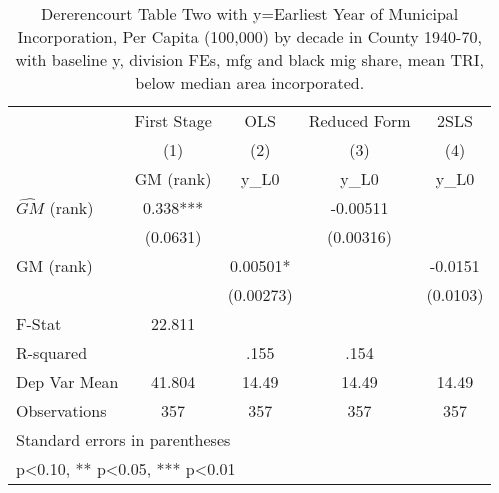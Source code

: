 \begin{table}[htbp]\centering
\def\sym#1{\ifmmode^{#1}\else\(^{#1}\)\fi}
\caption{Dererencourt Table Two with y=Earliest Year of Municipal Incorporation, Per Capita (100,000) by decade in County 1940-70, with baseline y, division FEs, mfg and black mig share, mean TRI, below median area incorporated.}
\begin{tabular}{l*{4}{c}}
\toprule
                    & First Stage   &         OLS   &Reduced Form   &        2SLS   \\
                    &\multicolumn{1}{c}{(1)}&\multicolumn{1}{c}{(2)}&\multicolumn{1}{c}{(3)}&\multicolumn{1}{c}{(4)}\\
                    &\multicolumn{1}{c}{GM  (rank)}&\multicolumn{1}{c}{y\_L0}&\multicolumn{1}{c}{y\_L0}&\multicolumn{1}{c}{y\_L0}\\
\midrule
$\hat{GM}$ (rank)   &       0.338***&               &    -0.00511   &               \\
                    &    (0.0631)   &               &   (0.00316)   &               \\
\addlinespace
GM  (rank)          &               &     0.00501*  &               &     -0.0151   \\
                    &               &   (0.00273)   &               &    (0.0103)   \\
\midrule
F-Stat              &      22.811   &               &               &               \\
R-squared           &               &        .155   &        .154   &               \\
Dep Var Mean        &      41.804   &       14.49   &       14.49   &       14.49   \\
Observations        &         357   &         357   &         357   &         357   \\
\bottomrule
\multicolumn{5}{l}{\footnotesize Standard errors in parentheses}\\
\multicolumn{5}{l}{\footnotesize * p<0.10, ** p<0.05, *** p<0.01}\\
\end{tabular}
\end{table}
